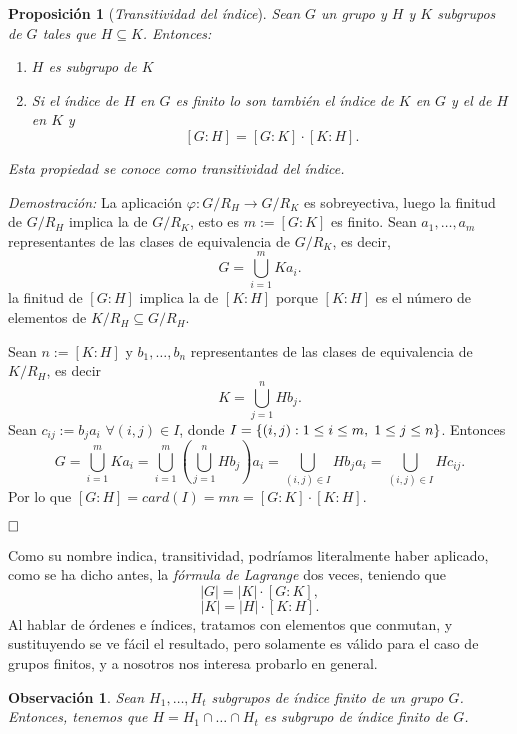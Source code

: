 \documentclass[12pt]{article}
\newtheorem{proposition}[theorem]{Proposición}
\newtheorem{observation}{Observación}[theorem]
\begin{document}
\begin{proposition}[\textit{Transitividad del índice}]Sean $G$ un grupo y $H$ y $K$ subgrupos de $G$ tales que $H \subseteq K$. Entonces:
\begin{enumerate}
\item $H$ es subgrupo de $K$
\item Si el índice de $H$ en $G$ es finito lo son también el índice de $K$ en $G$ y el de $H$ en $K$ y $$\left[ G:H \right] = \left[ G:K \right]\cdot \left[ K:H \right].$$
\end{enumerate}
Esta propiedad se conoce como \textit{transitividad del índice.}
\end{proposition}
\emph{Demostración: }La aplicación $\varphi \colon G/R_{H}  \longrightarrow  G/R_{K}$ es sobreyectiva, luego la finitud de $G/R_{H}$ implica la de $G/R_{K}$, esto es $m:= \left[ G:K \right]$ es finito. Sean $a_{1}, \ldots, a_{m}$ representantes de las clases de equivalencia de $G/R_{K}$, es decir, $$G = \bigcup_{i=1}^{m} Ka_{i}.$$ la finitud de $\left[ G:H \right]$ implica la de $\left[ K:H \right]$ porque $\left[ K:H \right]$ es el número de elementos de $K/R_{H} \subseteq G/R_{H}$.

Sean $n:= \left[ K:H \right]$ y $b_{1},\ldots,b_{n}$ representantes de las clases de equivalencia de $K/R_{H}$, es decir $$K = \bigcup_{j=1}^{n}Hb_{j}.$$ Sean $c_{ij}:=b_{j}a_{i}$ $\forall (i,j) \in I$, donde $I = \lbrace(i,j) : 1\leq i \leq m, \hspace{0.1cm} 1\leq j \leq n\rbrace$. Entonces $$G = \bigcup_{i=1}^{m}Ka_{i} = \bigcup_{i=1}^{m}(\bigcup_{j=1}^{n}Hb_{j})a_{i} = \bigcup_{(i,j)\in I}Hb_{j}a_{i} = \bigcup_{(i,j) \in I}Hc_{ij}.$$ Por lo que $\left[ G:H \right] = card(I) = mn= \left[ G:K \right] \cdot \left[ K:H \right]$.

$\hfill \square$

Como su nombre indica, transitividad, podríamos literalmente haber aplicado, como se ha dicho antes, la \textit{fórmula de Lagrange} dos veces, teniendo que $$|G| = |K| \cdot [G : K],$$ $$|K| = |H| \cdot [K:H].$$ Al hablar de órdenes e índices, tratamos con elementos que conmutan, y sustituyendo se ve fácil el resultado, pero solamente es válido para el caso de grupos finitos, y a nosotros nos interesa probarlo en general.

\begin{observation} Sean $H_{1},\ldots,H_{t}$ subgrupos de índice finito de un grupo $G$. Entonces, tenemos que $H = H_{1}\cap \ldots \cap H_{t}$ es subgrupo de índice finito de $G$.
\end{observation}
\end{document}
